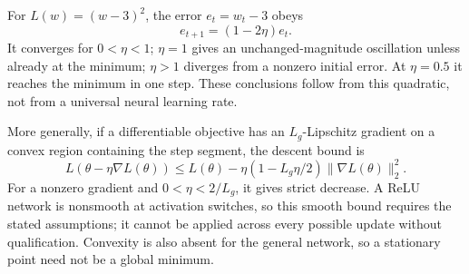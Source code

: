 \par\addvspace{\intextsep}\noindent\begin{minipage}{\linewidth}
\centering
{}
\label{fig:gradient-descent-surface}
\end{minipage}\par\addvspace{\intextsep}

For $L(w)=(w-3)^2$, the error $e_t=w_t-3$ obeys
\[
e_{t+1}=(1-2\eta)e_t.
\]
It converges for $0<\eta<1$; $\eta=1$ gives an unchanged-magnitude oscillation unless already at the minimum; $\eta>1$ diverges from a nonzero initial error. At $\eta=0.5$ it reaches the minimum in one step. These conclusions follow from this quadratic, not from a universal neural learning rate.

More generally, if a differentiable objective has an $L_g$-Lipschitz gradient on a convex region containing the step segment, the descent bound is
\[
L(\theta-\eta\nabla L(\theta))
\leq L(\theta)-\eta(1-L_g\eta/2)\|\nabla L(\theta)\|_2^2.
\]
For a nonzero gradient and $0<\eta<2/L_g$, it gives strict decrease. A ReLU network is nonsmooth at activation switches, so this smooth bound requires the stated assumptions; it cannot be applied across every possible update without qualification. Convexity is also absent for the general network, so a stationary point need not be a global minimum.

